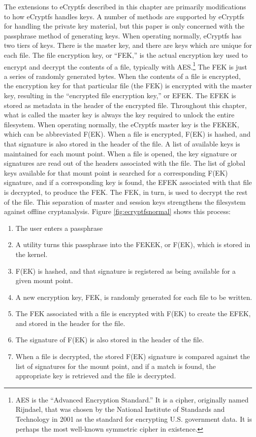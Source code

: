 The extensions to eCryptfs described in this chapter are primarily modifications
to how eCryptfs handles keys. A number of methods are supported by eCryptfs for handling the private key material, but this paper is
only concerned with the passphrase method of generating keys. When operating normally, eCryptfs has two tiers of keys.
There is the master key, and there are keys which are unique for each file. The file encryption key, or ``FEK,'' is the actual
encryption key used to encrypt and decrypt the contents of a file, typically with AES.\footnote{AES is the ``Advanced Encryption
Standard.'' It is a cipher, originally named Rijndael, that was chosen by the National Institute of Standards and Technology in 2001
as the standard for encrypting U.S. government data. It is perhaps the most well-known symmetric cipher in existence.}  The FEK is
just a series of randomly generated bytes. When the contents of a file is encrypted, the encryption key for that particular file
(the FEK) is encrypted with the master key, resulting in the ``encrypted file encryption key,'' or EFEK.  The EFEK is stored as
metadata in the header of the encrypted file.  Throughout this chapter, what is called the master key is always the key required to
unlock the entire filesystem. When operating normally, the eCryptfs master key is the FEKEK, which can be abbreviated
F(EK).  When a file is encrypted, F(EK) is hashed, and that signature is also stored in the header of
the file. A list of available keys is maintained for each mount point.  When a file is opened, the key signature or signatures are
read out of the headers associated with the file. The list of global keys available for that mount point is searched for a
corresponding F(EK) signature, and if a corresponding key is found, the EFEK associated with that file is decrypted,
to produce the FEK. The FEK, in turn, is used to decrypt the rest of the file.  This separation of master and session keys
strengthens the filesystem against offline cryptanalysis. Figure \ref{fig:ecryptfsnormal} shows this process:
\begin{enumerate}
	\item{The user enters a passphrase}
	\item{A utility turns this passphrase into the FEKEK, or F(EK), which is stored in the kernel.}
	\item{F(EK) is hashed, and that signature is registered as being available for a given mount point.}
	\item{A new encryption key, FEK, is randomly generated for each file to be written.}
	\item{The FEK associated with a file is encrypted with F(EK) to create the EFEK, and stored in the header for the file.}
	\item{The signature of F(EK) is also stored in the header of the file.}
	\item{When a file is decrypted, the stored F(EK) signature is compared against the list of signatures for the mount point,
		and if a match is found, the appropriate key is retrieved and the file is decrypted.}
\end{enumerate}

